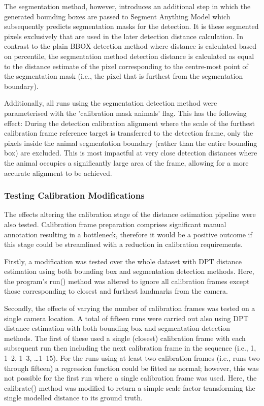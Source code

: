 The segmentation method, however, introduces an additional step in which the generated bounding
boxes are passed to Segment Anything Model which subsequently predicts segmentation masks for
the detection.
It is these segmented pixels exclusively that are used in the later detection distance calculation.
In contrast to the plain BBOX detection method where distance is calculated based on
percentile, the segmentation method detection distance is calculated as equal to the distance
estimate of the pixel corresponding to the centre-most point of the segmentation mask (i.e., the pixel
that is furthest from the segmentation boundary).

Additionally, all runs using the segmentation detection method were parameterised with the
'calibration mask animals' flag.
This has the following effect:
During the detection calibration alignment where the scale of the furthest calibration frame reference
target is transferred to the detection frame, only the pixels inside the animal segmentation boundary
(rather than the entire bounding box) are excluded.
This is most impactful at very close detection distances where the animal occupies a significantly
large area of the frame, allowing for a more accurate alignment to be achieved.

\clearpage

\subsubsection{Testing Calibration Modifications}

The effects altering the calibration stage of the distance estimation pipeline were also tested.
Calibration frame preparation comprises significant manual annotation resulting in a bottleneck,
therefore it would be a positive outcome if this stage could be streamlined with a reduction in
calibration requirements.

Firstly, a modification was tested over the whole dataset with DPT distance estimation using both
bounding box and segmentation detection methods.
Here, the program's run() method was altered to ignore all calibration frames except those corresponding
to closest and furthest landmarks from the camera.

Secondly, the effects of varying the number of calibration frames was tested on a single camera
location.
A total of fifteen runs were carried out also using DPT distance estimation with both bounding box
and segmentation detection methods.
The first of these used a single (closest) calibration frame with each subsequent run then including
the next calibration frame in the sequence (i.e., 1, 1–2, 1–3, \ldots 1–15).
For the runs using at least two calibration frames (i.e., runs two through fifteen) a regression
function could be fitted as normal; however, this was not possible for the first run where a single
calibration frame was used.
Here, the calibrate() method was modified to return a simple scale factor transforming the single
modelled distance to its ground truth.
